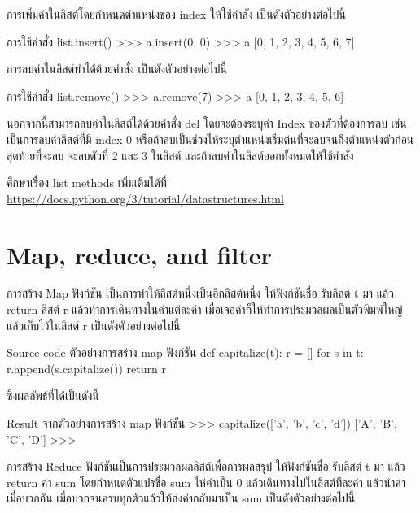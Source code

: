การเพิ่มค่าในลิสต์โดยกำหนดตำแหน่งของ  index ให้ใช้คำสั่ง   เป็นดังตัวอย่างต่อไปนี้
\begin{codelist}{การใช้คำสั่ง list.insert()}{}
>>> a.insert(0, 0)
>>> a
[0, 1, 2, 3, 4, 5, 6, 7]
\end{codelist}


การลบค่าในลิสต์ทำได้ด้วยคำสั่ง   เป็นดังตัวอย่างต่อไปนี้
\begin{codelist}{การใช้คำสั่ง list.remove()}{}
>>> a.remove(7)
>>> a
[0, 1, 2, 3, 4, 5, 6]
\end{codelist}


นอกจากนี้สามารถลบค่าในลิสต์ได้ด้วยคำสั่ง del โดยจะต้องระบุค่า Index ของตัวที่ต้องการลบ เช่น   เป็นการลบค่าลิสต์ที่มี index 0 หรือถ้าลบเป็นช่วงให้ระบุตำแหน่งเริ่มต้นที่จะลบจนถึงตำแหน่งตัวก่อนสุดท้ายที่จะลบ   จะลบตัวที่ 2 และ 3 ในลิสต์ และถ้าลบค่าในลิสต์ออกทั้งหมดให้ใช้คำสั่ง  

ศึกษาเรื่อง list methods เพิ่มเติมได้ที่ \url{https://docs.python.org/3/tutorial/datastructures.html}

\section{Map, reduce, and filter}

การสร้าง Map ฟังก์ชัน เป็นการทำให้ลิสต์หนึ่งเป็นอีกลิสต์หนึ่ง ให้ฟังก์ชันชื่อ   รับลิสต์ t มา แล้ว return ลิสต์ r แล้วทำการเดินทางในค่าแต่ละค่า เมื่อเจอค่าก็ให้ทำการประมวลผลเป็นตัวพิมพ์ใหญ่ แล้วเก็บไว้ในลิสต์ r เป็นดังตัวอย่างต่อไปนี้

\begin{codelist}{Source code ตัวอย่างการสร้าง map ฟังก์ชัน}{}
def capitalize(t):
    r = []
    for s in t:
        r.append(s.capitalize())
    return r
\end{codelist}

ซึ่งผลลัพธ์ที่ได้เป็นดังนี้

\begin{codelist}{Result จากตัวอย่างการสร้าง map ฟังก์ชัน}{}
>>> capitalize(['a', 'b', 'c', 'd'])
['A', 'B', 'C', 'D']
>>>
\end{codelist}


การสร้าง Reduce ฟังก์ชันเป็นการประมวลผลลิสต์เพื่อการผลสรุป ให้ฟังก์ชันชื่อ   รับลิสต์ t มา แล้ว return ค่า sum โดยกำหนดตัวแปรชื่อ sum ให้ค่าเป็น 0 แล้วเดินทางไปในลิสต์ทีละค่า แล้วนำค่าเมื่อบวกกัน เมื่อบวกจนครบทุกตัวแล้วให้ส่งค่ากลับมาเป็น sum เป็นดังตัวอย่างต่อไปนี้

